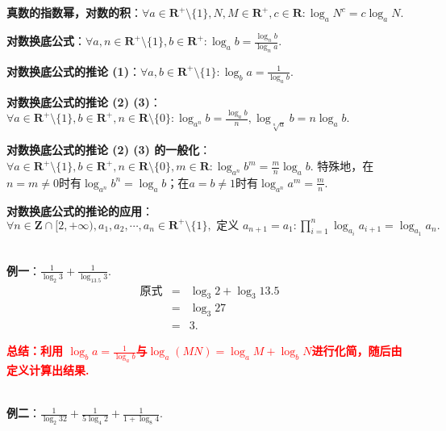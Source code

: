 \documentclass[8pt]{article}
\begin{document}
				\textbf{真数的指数幂，对数的积}：$\forall a\in \mathbf{R}^{+} \setminus \{1\}, N, M\in \mathbf{R}^{+}, c\in\mathbf{R}: \displaystyle \log_{a}{N^c}=c \log_{a}{N}.$

				\textbf{对数换底公式}：$\forall a, n\in \mathbf{R}^{+} \setminus \{1\}, b\in \mathbf{R}^{+}: \displaystyle \log_{a}{b}=\frac{\log_{n}{b}}{\log_{n}{a}}.$

				\textbf{对数换底公式的推论 (1)}：$\forall a, b\in \mathbf{R}^{+} \setminus \{1\}: \displaystyle \log_{b}{a}=\frac{1}{\log_{a}{b}}.$

				\textbf{对数换底公式的推论 (2) (3)}：$\forall a\in \mathbf{R}^{+} \setminus \{1\}, b\in \mathbf{R}^{+}, n\in \mathbf{R} \setminus \{0\}: \displaystyle \log_{a^n}{b}=\frac{\log_{a}{b}}{n}, \log_{\sqrt[n]{a}}{b}=n\log_{a}{b}.$

				\textbf{对数换底公式的推论 (2) (3) 的一般化}：$\forall a\in \mathbf{R}^{+} \setminus \{1\}, b\in \mathbf{R}^{+}, n\in \mathbf{R} \setminus \{0\}, m\in \mathbf{R}: \displaystyle \log_{a^n}{b^m}=\frac{m}{n} \log_{a}{b}.$ 特殊地，在$n=m\neq 0$时有$\displaystyle \log_{a^n}{b^n}=\log_{a}{b}$；在$a=b\neq 1$时有$\displaystyle \log_{a^n}{a^m}=\frac{m}{n}.$

				\textbf{对数换底公式的推论的应用}：$\forall n \in \mathbf{Z} \cap [2, +\infty), a_1, a_2, \cdots, a_n \in \mathbf{R}^{+} \setminus \{1\}, \text{ 定义 } a_{n+1}=a_1: \displaystyle \prod_{i=1}^{n}{\log_{a_i}{a_{i+1}}}=\log_{a_1}{a_n}.$

				~\\

				\textbf{例一}：$\displaystyle \frac{1}{\log_2 3}+\frac{1}{\log_{13.5} 3}$.
					~\\

					$$
					\begin{array}{rcl}
					\text{原式}&=&\log_{3}{2}+\log_{3}{13.5}\\
					&=&\log_{3}{27}\\
					&=&3.
					\end{array}
					$$

					\textcolor{red}{\textbf{总结：利用 $\displaystyle \log_{b}{a}=\frac{1}{\log_{a}{b}}$与$\log_{a}{(MN)}=\log_{a}{M}+\log_{b}{N}$进行化简，随后由定义计算出结果.}}

				~\\

				\textbf{例二}：$\displaystyle \frac{1}{\log_2 32}+\frac{1}{5\log_{4} 2}+\frac{1}{1+\log_{8} 4}$.
					~\\
\end{document}
